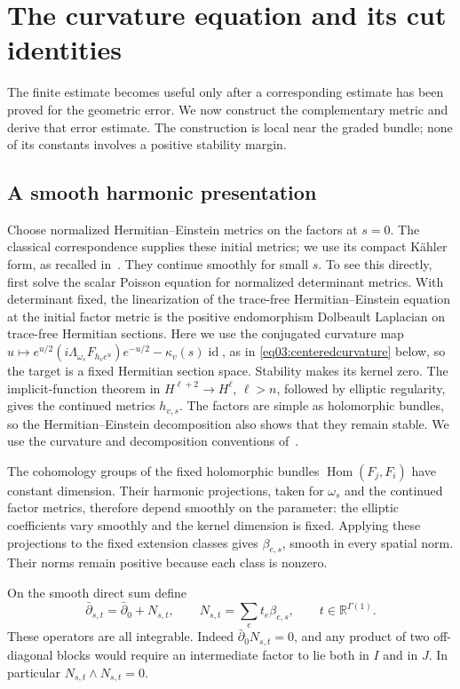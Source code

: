 \documentclass[11pt]{amsart}
\theoremstyle{definition}
\theoremstyle{remark}
\newcommand{\db}{\bar\partial}
\newcommand{\Hom}{\operatorname{Hom}}
\newcommand{\id}{\operatorname{id}}
\newcommand{\RR}{\mathbb R}
\begin{document}
\section{The curvature equation and its cut identities}
\label{sec03:complement}

The finite estimate becomes useful only after a corresponding estimate
has been proved for the geometric error. We now construct the
complementary metric and derive that error estimate. The construction
is local near the graded bundle; none of its constants involves a
positive stability margin.

\subsection{A smooth harmonic presentation}

Choose normalized Hermitian--Einstein metrics on the factors at
\(s=0\). The classical correspondence supplies these initial metrics;
we use its compact Kähler form, as recalled
in~\cite[Theorem 8]{sektnantipler2024}.
They continue smoothly for small \(s\). To see this directly, first
solve the scalar Poisson equation for normalized determinant metrics.
With determinant fixed, the linearization of the trace-free
Hermitian--Einstein equation at the initial factor metric is the
positive endomorphism Dolbeault Laplacian on trace-free Hermitian
sections. Here we use the conjugated curvature map
\(u\mapsto e^{u/2}(i\Lambda_{\omega_s}F_{h_ve^u})e^{-u/2}
-\kappa_v(s)\id\), as in \eqref{eq03:centeredcurvature} below,
so the target is a fixed Hermitian section space.
Stability makes its kernel zero. The implicit-function
theorem in \(H^{\ell+2}\to H^\ell\), \(\ell>n\), followed by elliptic
regularity, gives the continued metrics \(h_{v,s}\).
The factors are simple as holomorphic bundles, so the
Hermitian--Einstein decomposition also shows that they remain
stable. We use the curvature and decomposition conventions
of~\cite[\S\S4.2,5.8]{kobayashi1987}.

The cohomology groups of the fixed holomorphic bundles
\(\Hom(F_j,F_i)\) have constant dimension. Their harmonic
projections, taken for \(\omega_s\) and the continued factor metrics,
therefore depend smoothly on the parameter:
the elliptic coefficients vary smoothly and the kernel dimension
is fixed. Applying these projections to the fixed extension
classes gives \(\beta_{e,s}\), smooth in every spatial norm.
Their norms remain positive because each class is nonzero.

On the smooth direct sum define
\begin{equation}\label{eq03:amplitudes}
 \db_{s,t}=\db_0+N_{s,t},\qquad
 N_{s,t}=\sum_e t_e\beta_{e,s},
 \qquad t\in\RR^{\Gamma(1)}.
\end{equation}
These operators are all integrable. Indeed \(\db_0N_{s,t}=0\),
and any product of two off-diagonal blocks would require an
intermediate factor to lie both in \(I\) and in \(J\).
In particular \(N_{s,t}\wedge N_{s,t}=0\).
\end{document}
